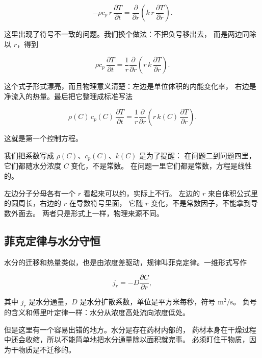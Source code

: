\begin{equation}
-\rho c_p\,r\,\frac{\partial T}{\partial t}
= \frac{\partial}{\partial r}\left(k\,r\,\frac{\partial T}{\partial r}\right).
\end{equation}

这里出现了符号不一致的问题。我们换个做法：不把负号移出去，
而是两边同除以 $r$，得到

\begin{equation}
\rho c_p\,\frac{\partial T}{\partial t}
= \frac{1}{r}\frac{\partial}{\partial r}\left(r\,k\,\frac{\partial T}{\partial r}\right).
\end{equation}

这个式子形式漂亮，而且物理意义清楚：左边是单位体积的内能变化率，
右边是净流入的热量。最后把它整理成标准写法

\begin{equation}
\boxed{\;
\rho(C)\,c_p(C)\,\frac{\partial T}{\partial t}
= \frac{1}{r}\frac{\partial}{\partial r}\left(r\,k(C)\,\frac{\partial T}{\partial r}\right).
\;}
\label{eq:energy}
\end{equation}

这就是第一个控制方程。

我们把系数写成 $\rho(C)$、$c_p(C)$、$k(C)$ 是为了提醒：
在问题二到问题四里，它们都随水分浓度 $C$ 变化，不是常数。
在问题一里它们都是常数，方程是线性的。

左边分子分母各有一个 $r$ 看起来可以约，实际上不行。
左边的 $r$ 来自体积公式里的圆周长，右边的 $r$ 在导数符号里面，
它随 $r$ 变化，不是常数因子，不能拿到导数外面去。
两者只是形式上一样，物理来源不同。

\subsection{菲克定律与水分守恒}

水分的迁移和热量类似，也是由浓度差驱动，规律叫菲克定律。一维形式写作

\begin{equation}
j_r = -D\frac{\partial C}{\partial r},
\end{equation}

其中 $j_r$ 是水分通量，$D$ 是水分扩散系数，单位是平方米每秒，符号 $\mathrm{m^2/s}$。
负号的含义和傅里叶定律一样：水分从浓度高处流向浓度低处。

但是这里有一个容易出错的地方。水分是存在药材内部的，
药材本身在干燥过程中还会收缩，所以不能简单地把水分通量除以面积就完事。
必须盯住干物质，因为干物质是不迁移的。

